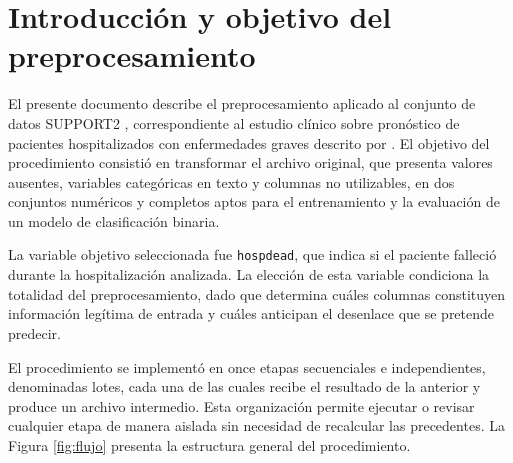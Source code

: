 \documentclass[11pt]{article}
\begin{document}

\tableofcontents
\newpage

\section{Introducción y objetivo del preprocesamiento}

El presente documento describe el preprocesamiento aplicado al conjunto de datos SUPPORT2
\parencite{support2}, correspondiente al estudio clínico sobre pronóstico de pacientes
hospitalizados con enfermedades graves descrito por \textcite{knaus1995support}. El objetivo del
procedimiento consistió en transformar el archivo original, que presenta valores ausentes,
variables categóricas en texto y columnas no utilizables, en dos conjuntos numéricos y completos
aptos para el entrenamiento y la evaluación de un modelo de clasificación binaria.

La variable objetivo seleccionada fue \texttt{hospdead}, que indica si el paciente falleció
durante la hospitalización analizada. La elección de esta variable condiciona la totalidad del
preprocesamiento, dado que determina cuáles columnas constituyen información legítima de entrada
y cuáles anticipan el desenlace que se pretende predecir.

El procedimiento se implementó en once etapas secuenciales e independientes, denominadas lotes,
cada una de las cuales recibe el resultado de la anterior y produce un archivo intermedio. Esta
organización permite ejecutar o revisar cualquier etapa de manera aislada sin necesidad de
recalcular las precedentes. La Figura \ref{fig:flujo} presenta la estructura general del
procedimiento.
\end{document}
